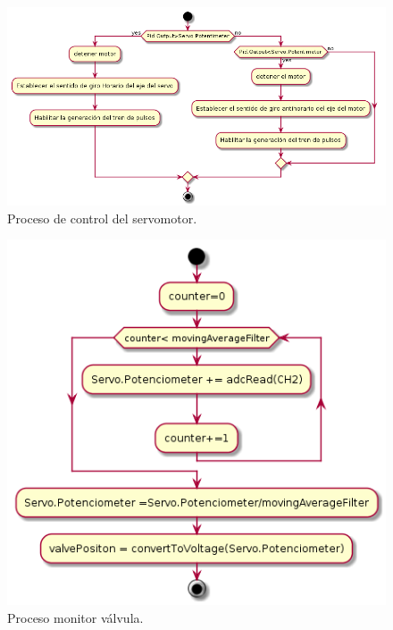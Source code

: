 \begin{figure}[htpb]
	\centering
	\includegraphics[scale=.55]{./Figures/ProcesoControlServo.png}
	\caption{Proceso de control del servomotor.}
	\label{fig:Control servomotor}
	\end{figure}

 	\begin{figure}[htpb]
	\centering
	\includegraphics[scale=.65]{./Figures/MonitorValvula.png}
	\caption{Proceso monitor válvula.}
	\label{fig:Proceso monitor valvula}
	\end{figure}

